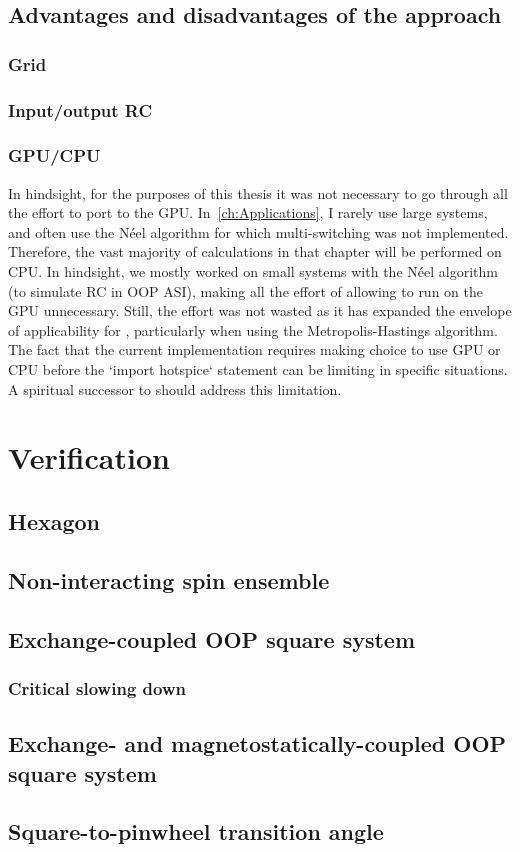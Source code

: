 \subsection{Advantages and disadvantages of the \hotspice approach} %
\subsubsection{Grid}
\subsubsection{Input/output RC}
\subsubsection{GPU/CPU}
In hindsight, for the purposes of this thesis it was not necessary to go through all the effort to port \hotspice to the GPU.
In~\cref{ch:Applications}, I rarely use large systems, and often use the N\'eel algorithm for which multi-switching was not implemented.
Therefore, the vast majority of calculations in that chapter will be performed on CPU. 
In hindsight, we mostly worked on small systems with the N\'eel algorithm (to simulate RC in OOP ASI), making all the effort of allowing \hotspice to run on the GPU unnecessary. Still, the effort was not wasted as it has expanded the envelope of applicability for \hotspice, particularly when using the Metropolis-Hastings algorithm.
The fact that the current implementation requires making choice to use GPU or CPU before the `import hotspice` statement can be limiting in specific situations. A spiritual successor to \hotspice should address this limitation.

\section{Verification} %
\subsection{Hexagon}
\subsection{Non-interacting spin ensemble}
\subsection{Exchange-coupled OOP square system}
\subsubsection{Critical slowing down}
\subsection{Exchange- and magnetostatically-coupled OOP square system}
\subsection{Square-to-pinwheel transition angle}

